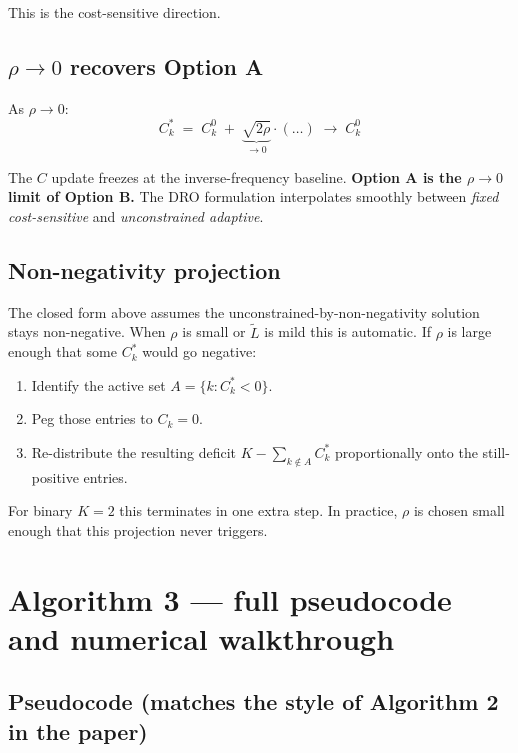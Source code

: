\documentclass[11pt,a4paper]{article}
\begin{document}
\checkmark This is the cost-sensitive direction.

\subsection{$\rho \to 0$ recovers Option A}

As $\rho \to 0$:
\[
C_k^{*} \;=\; C_k^{0} \;+\; \underbrace{\sqrt{2\rho}}_{\to 0}\cdot(\ldots) \;\longrightarrow\; C_k^{0}
\]

The $C$ update freezes at the inverse-frequency baseline. \textbf{Option A is the $\rho \to 0$ limit of Option B.} The DRO formulation interpolates smoothly between \emph{fixed cost-sensitive} and \emph{unconstrained adaptive}.

\subsection{Non-negativity projection}

The closed form above assumes the unconstrained-by-non-negativity solution stays non-negative. When $\rho$ is small or $\widetilde{L}$ is mild this is automatic. If $\rho$ is large enough that some $C_k^*$ would go negative:

\begin{enumerate}[leftmargin=*,itemsep=2pt]
  \item Identify the active set $A = \{k : C_k^* < 0\}$.
  \item Peg those entries to $C_k = 0$.
  \item Re-distribute the resulting deficit $K - \sum_{k \notin A} C_k^*$ proportionally onto the still-positive entries.
\end{enumerate}

For binary $K = 2$ this terminates in one extra step. In practice, $\rho$ is chosen small enough that this projection never triggers.

\section{Algorithm 3 --- full pseudocode and numerical walkthrough}

\subsection{Pseudocode (matches the style of Algorithm 2 in the paper)}
\end{document}

